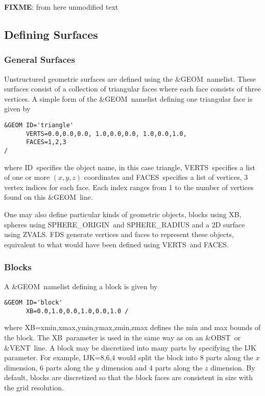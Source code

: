 \documentclass[12pt]{article}
\begin{document}
\textbf{FIXME}: from here unmodified text

\subsection{Defining Surfaces}

\subsubsection{General Surfaces}

Unstructured geometric surfaces are defined using the {\ct \&GEOM}\ namelist.
These surfaces consist of a collection of triangular faces where each face consists of three vertices.
A simple form of the {\ct \&GEOM}\ namelist defining one triangular face is given by

\begin{verbatim}
&GEOM ID='triangle'
      VERTS=0.0,0.0,0.0, 1.0,0.0,0.0, 1.0,0.0,1.0,
      FACES=1,2,3
/
\end{verbatim}

\noindent where {\ct ID}\ specifies the object name, in this case {\ct triangle},
{\ct VERTS}\ specifies a list of one or more $(x,y,z)$ coordinates and {\ct FACES}\ specifies a list of vertices, 3 vertex indices for each
face. Each index ranges from 1 to the number of vertices found on this {\ct \&GEOM}\ line.

One may also define particular kinds of geometric objects,  blocks using {\ct XB}, spheres using {\ct SPHERE\_ORIGIN}\ and {\ct SPHERE\_RADIUS}
and a 2D surface using {\ct ZVALS}.
FDS generate vertices and faces to represent these objects, equivalent to what would have been defined using {\ct VERTS}\ and {\ct FACES}.

\subsubsection{Blocks}
A {\ct \&GEOM}\ namelist defining a block is given by

\begin{verbatim}
&GEOM ID='block'
      XB=0.0,1.0,0.0,1.0,0.0,1.0 /
\end{verbatim}

\noindent where {\ct XB=xmin,xmax,ymin,ymax,zmin,zmax} defines the min and max bounds of the block.
The {\ct XB}\ parameter is used in the same way as on an {\ct \&OBST}\ or {\ct \&VENT}\ line.
A block may be discretized into many parts by
specifying the {\ct IJK} parameter.  For example, {\ct IJK=8,6,4} would split the block
into 8 parts along the $x$ dimension, 6 parts along the $y$ dimension and 4 parts along
the $z$ dimension. By default, blocks are discretized
so that the block faces are consistent in size with the grid resolution.
\end{document}
